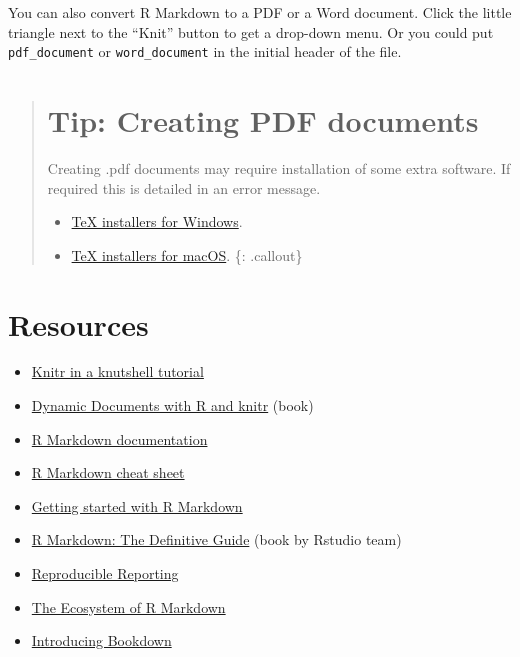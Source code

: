 \documentclass[]{book}
\providecommand{\tightlist}{%
  \setlength{\itemsep}{0pt}\setlength{\parskip}{0pt}}
\begin{document}
You can also convert R Markdown to a PDF or a Word document. Click the
little triangle next to the ``Knit'' button to get a drop-down menu. Or
you could put \texttt{pdf\_document} or \texttt{word\_document} in the
initial header of the file.

\begin{quote}
\section{Tip: Creating PDF documents}\label{tip-creating-pdf-documents}

Creating .pdf documents may require installation of some extra software.
If required this is detailed in an error message.

\begin{itemize}
\tightlist
\item
  \href{https://miktex.org/2.9/setup}{TeX installers for Windows}.
\item
  \href{https://tug.org/mactex}{TeX installers for macOS}. \{:
  .callout\}
\end{itemize}
\end{quote}

\section{Resources}\label{resources}

\begin{itemize}
\tightlist
\item
  \href{http://kbroman.org/knitr_knutshell}{Knitr in a knutshell
  tutorial}
\item
  \href{http://www.amazon.com/exec/obidos/ASIN/1482203537/7210-20}{Dynamic
  Documents with R and knitr} (book)
\item
  \href{http://rmarkdown.rstudio.com}{R Markdown documentation}
\item
  \href{https://www.rstudio.com/wp-content/uploads/2016/03/rmarkdown-cheatsheet-2.0.pdf}{R
  Markdown cheat sheet}
\item
  \href{https://www.rstudio.com/resources/webinars/getting-started-with-r-markdown/}{Getting
  started with R Markdown}
\item
  \href{https://bookdown.org/yihui/rmarkdown/}{R Markdown: The
  Definitive Guide} (book by Rstudio team)
\item
  \href{https://www.rstudio.com/resources/webinars/reproducible-reporting/}{Reproducible
  Reporting}
\item
  \href{https://www.rstudio.com/resources/webinars/the-ecosystem-of-r-markdown/}{The
  Ecosystem of R Markdown}
\item
  \href{https://www.rstudio.com/resources/webinars/introducing-bookdown/}{Introducing
  Bookdown}
\end{itemize}


\end{document}
